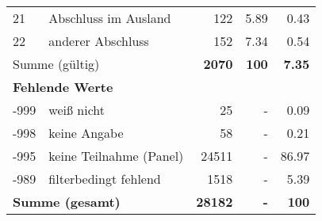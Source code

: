 \begin{longtable}{lXrrr}
     21 &
     \multicolumn{1}{X}{ Abschluss im Ausland   } &


       \num{122} &
       \num[round-mode=places,round-precision=2]{5.89} &
         \num[round-mode=places,round-precision=2]{0.43} \\

     22 &
     \multicolumn{1}{X}{ anderer Abschluss   } &


       \num{152} &
       \num[round-mode=places,round-precision=2]{7.34} &
         \num[round-mode=places,round-precision=2]{0.54} \\
     \midrule
     \multicolumn{2}{l}{Summe (gültig)} &
       \textbf{\num{2070}} &
     \textbf{100} &
       \textbf{\num[round-mode=places,round-precision=2]{7.35}} \\
     \multicolumn{5}{l}{\textbf{Fehlende Werte}}\\
       -999 &
       weiß nicht &
         \num{25} &
        - &
         \num[round-mode=places,round-precision=2]{0.09} \\
       -998 &
       keine Angabe &
         \num{58} &
        - &
         \num[round-mode=places,round-precision=2]{0.21} \\
       -995 &
       keine Teilnahme (Panel) &
         \num{24511} &
        - &
         \num[round-mode=places,round-precision=2]{86.97} \\
       -989 &
       filterbedingt fehlend &
         \num{1518} &
        - &
         \num[round-mode=places,round-precision=2]{5.39} \\
     \midrule
     \multicolumn{2}{l}{\textbf{Summe (gesamt)}} &
          \textbf{\num{28182}} &
        \textbf{-} &
        \textbf{100} \\
     \bottomrule
     \end{longtable}
     
